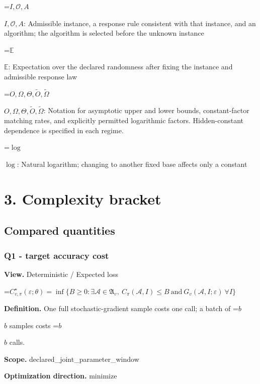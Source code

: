 \documentclass[10pt,a4paper]{article}
\newcommand{\AtlasMath}[1]{\par\begingroup\centering\setbox0=\hbox{$\displaystyle #1$}\ifdim\wd0>1.4\linewidth\typeout{ATLAS WIDE FORMULA: \the\wd0}\fi\ifdim\wd0>\linewidth\resizebox{\linewidth}{!}{\box0}\else\box0\fi\par\endgroup}
\newcommand{\AtlasInlineMath}[1]{\begingroup\setbox0=\hbox{$#1$}\ifdim\wd0>.4\linewidth\endgroup\AtlasMath{#1}\else\endgroup$#1$\fi}
\begin{document}
\AtlasInlineMath{I,\mathcal{O},A}: Admissible instance, a response rule consistent with that instance, and an algorithm; the algorithm is selected before the unknown instance



\AtlasInlineMath{\mathbb{E}}: Expectation over the declared randomness after fixing the instance and admissible response law



\AtlasInlineMath{O,\Omega,\Theta,\widetilde{O},\widetilde\Omega}: Notation for asymptotic upper and lower bounds, constant-factor matching rates, and explicitly permitted logarithmic factors. Hidden-constant dependence is specified in each regime.



\AtlasInlineMath{\log}: Natural logarithm; changing to another fixed base affects only a constant



\section{3. Complexity bracket}


\subsection{Compared quantities}


\subsubsection{Q1 - target accuracy cost}


\textbf{View.} Deterministic / Expected loss



\AtlasMath{C^\star_{v,\pi}(\varepsilon;\theta)=\inf\{B\ge0:\exists\mathcal A\in\mathfrak A_v,\ C_\pi(\mathcal A,I)\le B\ \text{and}\ G_v(\mathcal A,I;\varepsilon)\ \forall I\}}


\textbf{Definition.} One full stochastic-gradient sample costs one call; a batch of \AtlasInlineMath{b} samples costs \AtlasInlineMath{b} calls.



\textbf{Scope.} declared\_joint\_parameter\_window



\textbf{Optimization direction.} minimize
\end{document}
